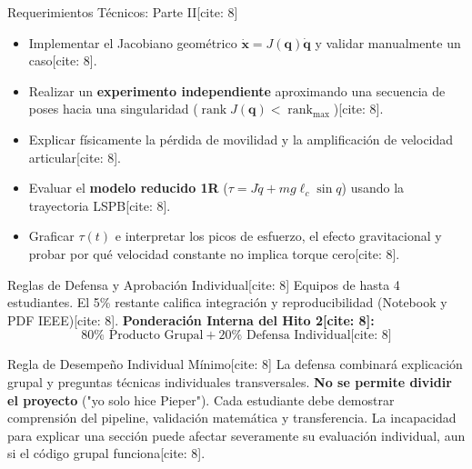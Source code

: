 \documentclass[aspectratio=169, xcolor={table,xcdraw}]{beamer}
\begin{document}
\begin{frame}{Requerimientos Técnicos: Parte II[cite: 8]}
    \begin{tcolorbox}[colback=white, colframe=ucbblue, title=\textbf{Jacobiano y Singularidades} {(20\%)[cite: 8]}, boxsep=0mm, top=1mm, bottom=1mm, left=1mm, right=1mm]
        \footnotesize
        \begin{itemize}
            \item Implementar el Jacobiano geométrico $\dot{\mathbf{x}} = J(\mathbf{q})\dot{\mathbf{q}}$ y validar manualmente un caso[cite: 8].
            \item Realizar un \textbf{experimento independiente} aproximando una secuencia de poses hacia una singularidad ($\operatorname{rank}J(\mathbf{q}) < \operatorname{rank}_{\max}$)[cite: 8].
            \item Explicar físicamente la pérdida de movilidad y la amplificación de velocidad articular[cite: 8].
        \end{itemize}
    \end{tcolorbox}
    
    \vspace{0.2cm}
    \begin{tcolorbox}[colback=white, colframe=ucbblue, title=\textbf{Dinámica y Torque} {(15\%)[cite: 8]}, boxsep=0mm, top=1mm, bottom=1mm, left=1mm, right=1mm]
        \footnotesize
        \begin{itemize}
            \item Evaluar el \textbf{modelo reducido 1R} ($\tau = J\ddot{q} + mg\ell_c\sin q$) usando la trayectoria LSPB[cite: 8].
            \item Graficar $\tau(t)$ e interpretar los picos de esfuerzo, el efecto gravitacional y probar por qué velocidad constante no implica torque cero[cite: 8].
        \end{itemize}
    \end{tcolorbox}
\end{frame}

\begin{frame}{Reglas de Defensa y Aprobación Individual[cite: 8]}
    \small Equipos de hasta 4 estudiantes. El 5\% restante califica integración y reproducibilidad (Notebook y PDF IEEE)[cite: 8].
    \vfill
    \textbf{Ponderación Interna del Hito 2[cite: 8]:}
    \begin{equation*}
        \boxed{ 80\% \text{ Producto Grupal} + 20\% \text{ Defensa Individual} } \text{[cite: 8]}
    \end{equation*}
    
    \vfill
    \begin{alertblock}{Regla de Desempeño Individual Mínimo[cite: 8]}
        \footnotesize
        La defensa combinará explicación grupal y preguntas técnicas individuales transversales. \textbf{No se permite dividir el proyecto} ("yo solo hice Pieper"). Cada estudiante debe demostrar comprensión del pipeline, validación matemática y transferencia. La incapacidad para explicar una sección puede afectar severamente su evaluación individual, aun si el código grupal funciona[cite: 8].
    \end{alertblock}
\end{frame}
\end{document}
